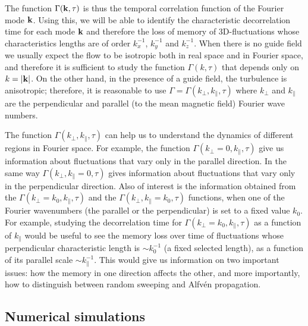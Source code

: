 \documentclass[aip,pop,reprint,amsmath,amssymb,floatfix]{revtex4-1}
\begin{document}
The function $\Gamma({\bf k},\tau)$ is thus the temporal correlation
function of the Fourier mode ${\bf k}$. Using this, we will be able to
identify the characteristic decorrelation time for each mode ${\bf k}$ and
therefore the loss of memory of 3D-fluctuations whose characteristics
lengths are of order $k_x^{-1}$, $k_y^{-1}$ and $k_z^{-1}$. When there
is no guide field we usually expect the flow to be isotropic both in real
space and in Fourier space, and therefore it is sufficient to study the
function $\Gamma(k,\tau)$ that depends only on $k=|{\bf k}|$. On the
other hand, in the presence of a guide field, the turbulence is
anisotropic; therefore, it is reasonable to use $\Gamma =
\Gamma(k_\perp,k_\parallel,\tau)$ where $k_\perp$ and $k_\parallel$
are the perpendicular and parallel (to the mean magnetic field) Fourier
wave numbers.

The function $\Gamma(k_\perp,k_\parallel,\tau)$ can help us to
understand the dynamics of different regions in Fourier space. For
example, the function $\Gamma(k_\perp=0,k_\parallel,\tau)$ give us
information about fluctuations that vary only in the parallel
direction. In the same way $\Gamma(k_\perp,k_\parallel=0,\tau)$ gives
information about fluctuations that vary only 
in the perpendicular direction. Also of interest is 
the information obtained from the
$\Gamma(k_\perp=k_0,k_\parallel,\tau)$ and the 
$\Gamma(k_\perp,k_\parallel=k_0,\tau)$ functions, when one of the
Fourier wavenumbers (the parallel or the perpendicular) is set to a
fixed value $k_0$. For example, studying the decorrelation time for
$\Gamma(k_\perp=k_0,k_\parallel,\tau)$ as a function of $k_\parallel$
would be useful to see the memory loss over time of 
fluctuations whose perpendicular characteristic length is 
$\sim k_0^{-1}$ (a fixed selected length), as a function of its
parallel scale $\sim k_\parallel^{-1}$. This would give us information
on two important issues: how the memory in one direction affects the
other, and more importantly, how to distinguish between random
sweeping and Alfv\'en propagation.


\subsection{Numerical simulations}\label{sec_NumSim}
\end{document}
